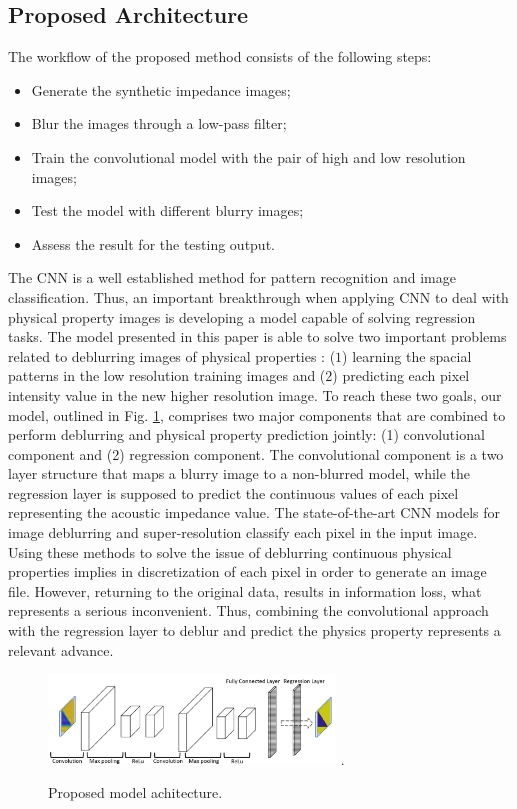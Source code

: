 \documentclass[conference]{IEEEtran}
\begin{document}
\subsection{Proposed Architecture}
The workflow of the proposed method consists of the following
steps:
\begin{itemize}
 \item Generate the synthetic impedance images;
 \item Blur the images through a low-pass filter;
 \item Train the convolutional model with the pair of high and low resolution images;
 \item Test the model with different blurry images;
 \item Assess the result for the testing output.
\end{itemize}

The CNN is a well established method for
pattern recognition and image classification.
Thus, an important breakthrough when applying CNN to
deal with physical property images is developing a model
capable of solving regression tasks. The model presented in this paper
is able to solve two important problems related to deblurring  images of physical properties
: ($1$) learning the spacial patterns in the low resolution
training images and ($2$) predicting each pixel intensity value in the new
higher resolution image. To reach these two goals, our model, outlined in Fig. \ref{fig_model},
comprises two major components that are combined to perform deblurring and physical property prediction
jointly: (1) convolutional component and (2) regression component. The convolutional component
is a two layer structure that maps a blurry image to a non-blurred model, while 
the regression layer is supposed to predict the continuous values of each pixel
representing the acoustic impedance value. 
The state-of-the-art CNN models for image deblurring \cite{Grigorios2017} and super-resolution \cite{Dahl2017}
classify each pixel in the input image. 
Using these methods to solve the issue of deblurring continuous physical properties 
implies in discretization of each pixel in order to generate an image file. However, returning
to the original data, results in information loss, what represents a serious inconvenient.
Thus, combining the convolutional approach with the regression layer to deblur and predict
the physics property represents a relevant advance.
\begin{figure}[!t]
\centering
\includegraphics[width=3.0in]{Figs/model}
\DeclareGraphicsExtensions.
\caption{Proposed model achitecture.}
\label{fig_model}
\end{figure}
\end{document}

